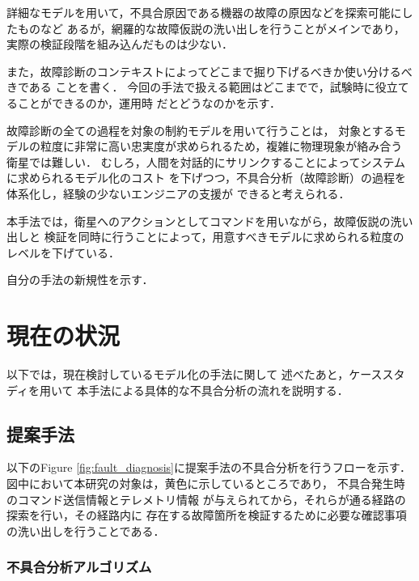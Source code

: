 \documentclass[11pt]{article}
\begin{document}
詳細なモデルを用いて，不具合原因である機器の故障の原因などを探索可能にしたものなど
あるが，網羅的な故障仮説の洗い出しを行うことがメインであり，
実際の検証段階を組み込んだものは少ない．

また，故障診断のコンテキストによってどこまで掘り下げるべきか使い分けるべきである
\cite{Ontology1998}ことを書く．
今回の手法で扱える範囲はどこまでで，試験時に役立てることができるのか，運用時
だとどうなのかを示す．

故障診断の全ての過程を対象の制約モデルを用いて行うことは，
対象とするモデルの粒度に非常に高い忠実度が求められるため，複雑に物理現象が絡み合う
衛星では難しい．
むしろ，人間を対話的にサリンクすることによってシステムに求められるモデル化のコスト
を下げつつ，不具合分析（故障診断）の過程を体系化し，経験の少ないエンジニアの支援が
できると考えられる．


本手法では，衛星へのアクションとしてコマンドを用いながら，故障仮説の洗い出しと
検証を同時に行うことによって，用意すべきモデルに求められる粒度のレベルを下げている．

自分の手法の新規性を示す．

%


\section{現在の状況}
以下では，現在検討しているモデル化の手法に関して
述べたあと，ケーススタディを用いて
本手法による具体的な不具合分析の流れを説明する．

\subsection{提案手法}
以下のFigure \ref{fig:fault_diagnosis}に提案手法の不具合分析を行うフローを示す．
図中において本研究の対象は，黄色に示しているところであり，
不具合発生時のコマンド送信情報とテレメトリ情報
が与えられてから，それらが通る経路の探索を行い，その経路内に
存在する故障箇所を検証するために必要な確認事項の洗い出しを行うことである．

\subsubsection{不具合分析アルゴリズム}
\end{document}
